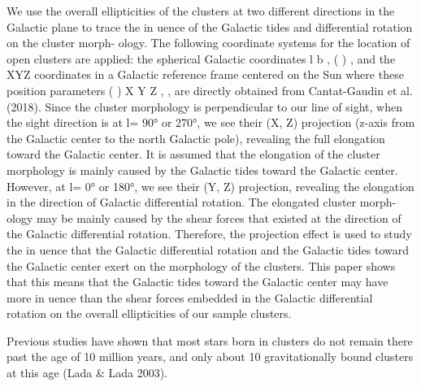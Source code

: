 \documentclass[../Main.tex]{subfiles}
\begin{document}
{We use the overall ellipticities of the clusters at two different
directions in the Galactic plane to trace the in uence of the
Galactic tides and differential rotation on the cluster morph-
ology. The following coordinate systems for the location of
open clusters are applied: the spherical Galactic coordinates
l b , ( )
, and the XYZ coordinates in a Galactic reference frame
centered on the Sun where these position parameters ( )
X Y Z , ,
are directly obtained from Cantat-Gaudin et al. (2018). Since
the cluster morphology is perpendicular to our line of sight,
when the sight direction is at l= 90° or 270°, we see their (X,
Z) projection (z-axis from the Galactic center to the north
Galactic pole), revealing the full elongation toward the Galactic
center. It is assumed that the elongation of the cluster
morphology is mainly caused by the Galactic tides toward
the Galactic center. However, at l= 0° or 180°, we see their (Y,
Z) projection, revealing the elongation in the direction of
Galactic differential rotation. The elongated cluster morph-
ology may be mainly caused by the shear forces that existed at
the direction of the Galactic differential rotation. Therefore, the
projection effect is used to study the in uence that the Galactic
differential rotation and the Galactic tides toward the Galactic
center exert on the morphology of the clusters.
This paper shows that this means that the Galactic tides
toward the Galactic center may have more in uence than the
shear forces embedded in the Galactic differential rotation on the
overall ellipticities of our sample clusters.

Previous studies have shown that most stars
born in clusters do not remain there past the age of 10 million
years, and only about 10%
gravitationally bound clusters at this age (Lada & Lada 2003).


}
\end{document}
